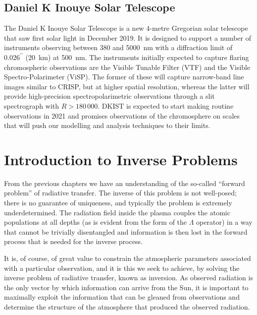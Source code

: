 \subsection{Daniel K Inouye Solar Telescope}

The Daniel K Inouye Solar Telescope \citep[DKIST, ][]{Rimmele2020} is a new 4-metre Gregorian solar telescope that saw first solar light in December 2019.
It is designed to support a number of instruments observing between 380 and \SI{5000}{\nano\metre} with a diffraction limit of $0.026^{\prime\prime}$ (\SI{20}{\kilo\metre}) at \SI{500}{\nano\metre}.
The instruments initially expected to capture flaring chromospheric observations are the Visible Tunable Filter (VTF) and the Visible Spectro-Polarimeter (ViSP).
The former of these will capture narrow-band line images similar to CRISP, but at higher spatial resolution, whereas the latter will provide high-precision spectropolarimetric observations through a slit spectrograph with $R>180\,000$.
DKIST is expected to start making routine observations in 2021 and promises observations of the chromosphere on scales that will push our modelling and analysis techniques to their limits.

\section{Introduction to Inverse Problems}\label{Sec:InverseProblems}

From the previous chapters we have an understanding of the so-called ``forward problem'' of radiative transfer.
The inverse of this problem is not well-posed; there is no guarantee of uniqueness, and typically the problem is extremely underdetermined.
The radiation field inside the plasma couples the atomic populations at all depths (as is evident from the form of the $\Lambda$ operator) in a way that cannot be trivially disentangled and information is then lost in the forward process that is needed for the inverse process.

It is, of course, of great value to constrain the atmospheric parameters associated with a particular observation, and it is this we seek to achieve, by solving the inverse problem of radiative transfer, known as inversion.
As observed radiation is the only vector by which information can arrive from the Sun, it is important to maximally exploit the information that can be gleaned from observations and determine the structure of the atmosphere that produced the observed radiation.

